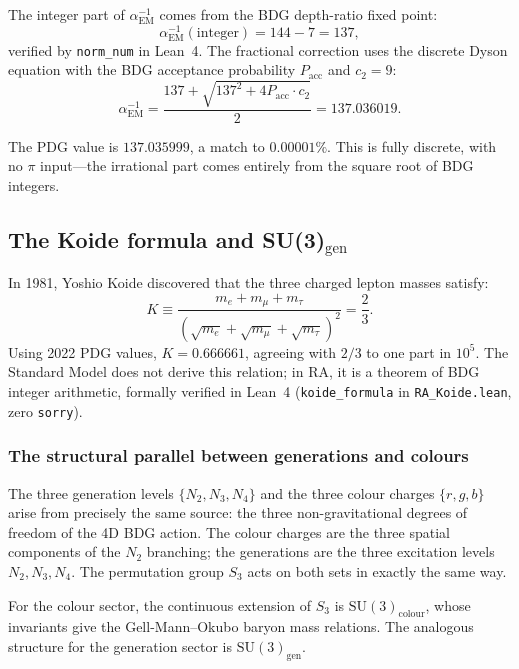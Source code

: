 \documentclass[11pt]{article}
\begin{document}
The integer part of $\alpha_{\mathrm{EM}}^{-1}$ comes from the BDG depth-ratio fixed point:
\begin{equation}
\alpha_{\mathrm{EM}}^{-1}(\text{integer}) = 144-7 = 137,
\end{equation}
verified by \texttt{norm\_num} in Lean~4. The fractional correction uses the discrete Dyson equation with the BDG acceptance probability $P_{\mathrm{acc}}$ and $c_2=9$:
\begin{equation}
\boxed{\alpha_{\mathrm{EM}}^{-1} = \frac{137+\sqrt{137^2+4P_{\mathrm{acc}}\cdot c_2}}{2} = 137.036019.}
\end{equation}

The PDG value is $137.035999$, a match to $0.00001\%$. This is fully discrete, with no $\pi$ input---the irrational part comes entirely from the square root of BDG integers.

\subsection{The Koide formula and SU(3)\texorpdfstring{$_{\mathrm{gen}}$}{gen}}
\label{sec:koide}

In 1981, Yoshio Koide discovered that the three charged lepton masses satisfy:
\begin{equation}
K \equiv \frac{m_e+m_\mu+m_\tau}{(\sqrt{m_e}+\sqrt{m_\mu}+\sqrt{m_\tau})^2} = \frac{2}{3}.
\end{equation}
Using 2022 PDG values, $K=0.666661$, agreeing with $2/3$ to one part in $10^5$. The Standard Model does not derive this relation; in RA, it is a theorem of BDG integer arithmetic, formally verified in Lean~4 (\texttt{koide\_formula} in \texttt{RA\_Koide.lean}, zero \texttt{sorry}).

\subsubsection{The structural parallel between generations and colours}

The three generation levels $\{N_2,N_3,N_4\}$ and the three colour charges $\{r,g,b\}$ arise from precisely the same source: the three non-gravitational degrees of freedom of the 4D BDG action. The colour charges are the three spatial components of the $N_2$ branching; the generations are the three excitation levels $N_2,N_3,N_4$. The permutation group $S_3$ acts on both sets in exactly the same way.

For the colour sector, the continuous extension of $S_3$ is $\mathrm{SU}(3)_{\mathrm{colour}}$, whose invariants give the Gell-Mann--Okubo baryon mass relations. The analogous structure for the generation sector is $\mathrm{SU}(3)_{\mathrm{gen}}$.
\end{document}
